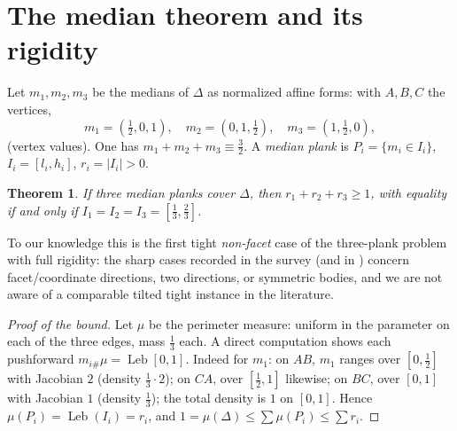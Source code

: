 \documentclass[11pt,reqno]{amsart}
\theoremstyle{plain}
\newtheorem{theorem}{Theorem}[section]
\theoremstyle{definition}
\theoremstyle{remark}
\newcommand{\Leb}{\operatorname{Leb}}
\begin{document}
\section{The median theorem and its rigidity}\label{sec:median}
Let $m_1,m_2,m_3$ be the medians of $\Delta$ as normalized affine forms: with
$A,B,C$ the vertices,
\[ m_1=(\tfrac12,0,1),\quad m_2=(0,1,\tfrac12),\quad m_3=(1,\tfrac12,0), \]
(vertex values). One has $m_1+m_2+m_3\equiv\tfrac32$. A \emph{median plank} is
$P_i=\{m_i\in I_i\}$, $I_i=[l_i,h_i]$, $r_i=|I_i|>0$.
\begin{theorem}\label{thm:median}
If three median planks cover $\Delta$, then $r_1+r_2+r_3\ge1$, with equality if and
only if $I_1=I_2=I_3=[\tfrac13,\tfrac23]$.
\end{theorem}
To our knowledge this is the first tight \emph{non-facet} case of the three-plank
problem with full rigidity: the sharp cases recorded in the survey
\cite{Verreault} (and in \cite{Gardner88,BY26}) concern facet/coordinate directions,
two directions, or symmetric bodies, and we are not aware of a comparable tilted
tight instance in the literature.
\begin{proof}[Proof of the bound]
Let $\mu$ be the perimeter measure: uniform in the parameter on each of the three
edges, mass $\tfrac13$ each. A direct computation shows each pushforward
$m_{i\#}\mu=\Leb[0,1]$. Indeed for $m_1$: on $AB$, $m_1$ ranges over $[0,\tfrac12]$
with Jacobian $2$ (density $\tfrac13\cdot2$); on $CA$, over $[\tfrac12,1]$ likewise;
on $BC$, over $[0,1]$ with Jacobian $1$ (density $\tfrac13$); the total density is
$1$ on $[0,1]$. Hence $\mu(P_i)=\Leb(I_i)=r_i$,
and $1=\mu(\Delta)\le\sum\mu(P_i)\le\sum r_i$.
\end{proof}
\end{document}
